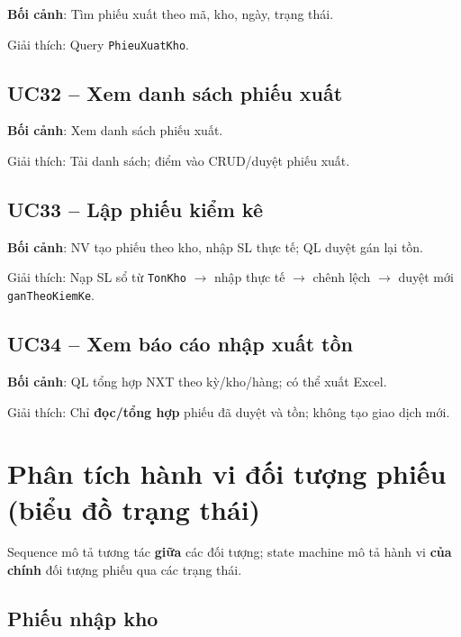 \textbf{Bối cảnh}: Tìm phiếu xuất theo mã, kho, ngày, trạng thái.



Giải thích: Query \texttt{PhieuXuatKho}.

\subsection{UC32 -- Xem danh sách phiếu xuất}

\textbf{Bối cảnh}: Xem danh sách phiếu xuất.



Giải thích: Tải danh sách; điểm vào CRUD/duyệt phiếu xuất.

\subsection{UC33 -- Lập phiếu kiểm kê}

\textbf{Bối cảnh}: NV tạo phiếu theo kho, nhập SL thực tế; QL duyệt gán lại tồn.



Giải thích: Nạp SL sổ từ \texttt{TonKho} $\rightarrow$ nhập thực tế $\rightarrow$ chênh lệch $\rightarrow$ duyệt mới \texttt{ganTheoKiemKe}.

\subsection{UC34 -- Xem báo cáo nhập xuất tồn}

\textbf{Bối cảnh}: QL tổng hợp NXT theo kỳ/kho/hàng; có thể xuất Excel.



Giải thích: Chỉ \textbf{đọc/tổng hợp} phiếu đã duyệt và tồn; không tạo giao dịch mới.

\section{Phân tích hành vi đối tượng phiếu (biểu đồ trạng thái)}

Sequence mô tả tương tác \textbf{giữa} các đối tượng; state machine mô tả hành vi \textbf{của chính} đối tượng phiếu qua các trạng thái.

\subsection{Phiếu nhập kho}

